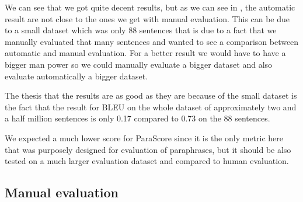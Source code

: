 \documentclass[fleqn,moreauthors,10pt]{ds_report}
\begin{document}
\begin{table}[h]
    \centering
    \caption{Results for different metrics on the 88 sentences.}
    \label{tab:metrics-results}
\end{table}

We can see that we got quite decent results, but as we can see in , the automatic result are not close to the ones we get with manual evaluation. This can be due to a small dataset which was only 88 sentences that is due to a fact that we manually evaluated that many sentences and wanted to see a comparison between automatic and manual evaluation. For a better result we would have to have a bigger man power so we could manually evaluate a bigger dataset and also evaluate automatically a bigger dataset.

The thesis that the results are as good as they are because of the small dataset is the fact that the result for BLEU on the whole dataset of approximately two and a half million sentences is only 0.17 compared to 0.73 on the 88 sentences.

We expected a much lower score for ParaScore since it is the only metric here that was purposely designed for evaluation of paraphrases, but it should be also tested on a much larger evaluation dataset and compared to human evaluation.

\subsection{Manual evaluation}
\label{sub-sec:manual_evaluation}
\end{document}
